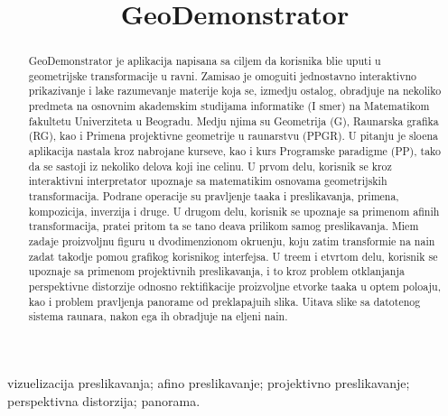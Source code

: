 \documentclass[cyr]{simposium}
\begin{document}
\begin{frontmatter}

\title{{\Lat GeoDemonstrator}}

\author{{ }}
\address{Matemati\ch ki fakultet, Univerzitet u Beogradu, Student{}ski trg 16, Beograd\\
}



\maketitle


\begin{abstract}
    {\Lat GeoDemonstrator} je aplikacija napisana sa ciljem da korisnika bli\zh e uputi u geometrijske transformacije u ravni. Zamisao je omogu\cc iti jednostavno interaktivno prikazivanje i lak\sh e razumevanje materije koja se, izmedju ostalog, obradjuje na nekoliko predmeta  na osnovnim akademskim studijama informatike (I smer) na Matemati\ch kom fakultetu Univerziteta u Beogradu. Medju njima su Geometrija (G), Ra\ch unarska grafika (RG), kao i Primena projektivne geometrije u ra\ch unarstvu (PPGR). U pitanju je slo\zh ena aplikacija nastala kroz nabrojane kurseve, kao i kurs Programske paradigme (PP), tako da se sastoji iz nekoliko delova koji \ch ine celinu. U prvom delu, korisnik se kroz interaktivni interpretator upoznaje sa matemati\ch kim osnovama geometrijskih transformacija. Podr\zh ane operacije su pravljenje ta\ch aka i preslikavanja, primena, kompozicija, inverzija i druge. U drugom delu, korisnik se upoznaje sa primenom afinih transformacija, prate\cc i pritom \sh ta se ta\ch no de\sh ava prilikom samog preslikavanja. Mi\sh em zadaje proizvoljnu figuru u dvodimenzionom okru\zh enju, koju zatim transformi\sh e na na\ch in zadat takodje pomo\cc u grafi\ch kog korisni\ch kog interfejsa. U tre\cc em i \ch etvrtom delu, korisnik se upoznaje sa primenom projektivnih preslikavanja, i to kroz problem otklanjanja perspektivne distorzije odnosno rektifikacije proizvoljne \ch etvorke ta\ch aka u op\sh tem polo\zh aju, kao i problem pravljenja panorame od preklapaju\cc ih slika. U\ch itava slike sa datote\ch nog sistema ra\ch unara, nakon \ch ega ih obradjuje na \zh eljeni na\ch in.
\end{abstract}
\begin{keyword}
   vizuelizacija preslikavanja; afino preslikavanje; projektivno preslikavanje; perspektivna distorzija; panorama.
\end{keyword}
\end{frontmatter}
\end{document}
